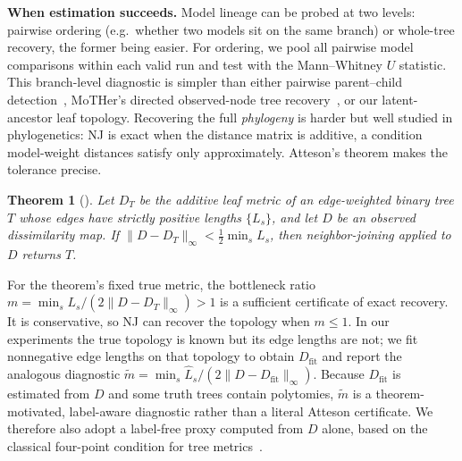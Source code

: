 \documentclass{article}
\newtheorem{theorem}{Theorem}
\theoremstyle{definition}
\theoremstyle{plain}
\begin{document}
\textbf{When estimation succeeds.}\label{sec:framework:theory}
Model lineage can be probed at two levels: pairwise ordering (e.g.\ whether two models sit on the same
branch) or whole-tree recovery, the former being easier. For ordering, we pool all pairwise model
comparisons within each valid run and test with the Mann--Whitney $U$ statistic. This branch-level
diagnostic is simpler than either pairwise parent--child detection~\citep{yu2025neural}, MoTHer's
directed observed-node tree recovery~\citep{horwitz2025mother}, or our latent-ancestor leaf topology. Recovering the full
\textit{phylogeny} is harder but well studied in phylogenetics: NJ is exact when the distance matrix is
additive, a condition model-weight distances satisfy only approximately. Atteson's theorem makes the
tolerance precise.
\begin{theorem}[\citealp{atteson1999performance}]\label{thm:atteson}
Let $D_T$ be the additive leaf metric of an edge-weighted binary tree $T$ whose edges have strictly
positive lengths $\{L_s\}$, and let $D$ be an observed dissimilarity map. If
$\lVert D-D_T\rVert_\infty < \tfrac12\min_s L_s$, then neighbor-joining applied to $D$ returns $T$.
\end{theorem}
For the theorem's fixed true metric, the bottleneck ratio
$m=\min_s L_s/(2\lVert D-D_T\rVert_\infty)>1$ is a sufficient certificate of exact recovery. It is
conservative, so NJ can recover the topology when $m\leq1$. In our experiments the true topology is
known but its edge lengths are not; we fit nonnegative edge lengths on that topology to obtain
$D_{\mathrm{fit}}$ and report the analogous diagnostic
$\widetilde m=\min_s\widehat L_s/(2\lVert D-D_{\mathrm{fit}}\rVert_\infty)$. Because
$D_{\mathrm{fit}}$ is estimated from $D$ and some truth trees contain polytomies, $\widetilde m$ is a
theorem-motivated, label-aware diagnostic rather than a literal Atteson certificate. We therefore also
adopt a label-free proxy computed from $D$ alone, based on the classical four-point condition for tree
metrics~\citep{sempleSteel2003phylogenetics}.
\end{document}
